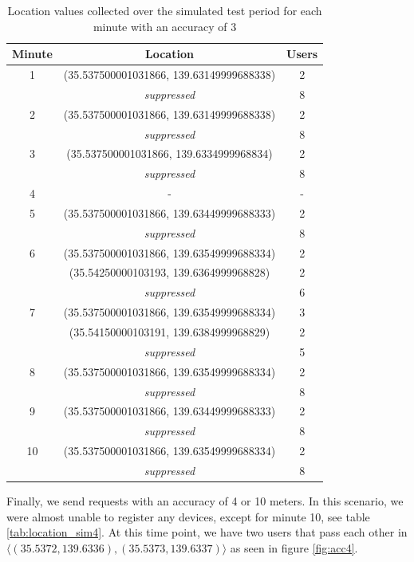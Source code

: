 \begin{table}[htbp]
	\centering
	\begin{tabular}{|c c c|} 
		\hline
		Minute & Location & Users\\ [0.5ex] 
		\hline\hline
		1 & (35.537500001031866, 139.63149999688338) & 2 \\ 
		&\textit{suppressed}& 8 \\ 
		\hline
		2 & (35.537500001031866, 139.63149999688338) & 2 \\ 
		&\textit{suppressed}& 8 \\ 
		\hline
		3 & (35.537500001031866, 139.6334999968834) & 2 \\ 
		&\textit{suppressed}& 8 \\ 
		\hline
		4 & - & - \\
		\hline
		5 & (35.537500001031866, 139.63449999688333) & 2 \\ 
		&\textit{suppressed}& 8 \\ 
		\hline
		6 & (35.537500001031866, 139.63549999688334) & 2 \\ 
		& (35.54250000103193, 139.6364999968828) & 2 \\ 
		&\textit{suppressed}& 6\\
		\hline
		7 & (35.537500001031866, 139.63549999688334) & 3 \\ 
		& (35.54150000103191, 139.6384999968829) & 2 \\ 
		&\textit{suppressed}& 5\\ 
		\hline
		8 & (35.537500001031866, 139.63549999688334) & 2 \\ 
		&\textit{suppressed}& 8 \\ 
		\hline
		9 & (35.537500001031866, 139.63449999688333) & 2 \\ 
		&\textit{suppressed}& 8 \\ 
		\hline
		10 & (35.537500001031866, 139.63549999688334) & 2 \\ 
		&\textit{suppressed}& 8 \\ 
		\hline
	\end{tabular}
	\caption{Location values collected over the simulated test period for each minute with an accuracy of 3}
	\label{tab:location_sim3}
\end{table}

Finally, we send requests with an accuracy of 4 or 10 meters. In this scenario, we were almost unable to register any devices, except for minute 10, see table \ref{tab:location_sim4}. At this time point, we have two users that pass each other in \(\langle(35.5372, 139.6336),(35.5373, 139.6337)\rangle\) as seen in figure \ref{fig:acc4}.

